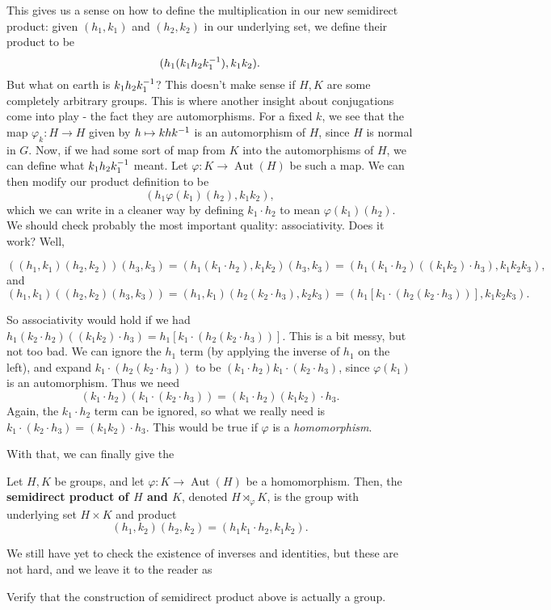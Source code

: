 \documentclass[./main.tex]{subfiles}
\begin{document}
This gives us a sense on how to define the multiplication in our new semidirect product:
given $(h_1,k_1)$ and $(h_2, k_2)$ in our underlying set, we define their product to be 
\[
    (h_1 (k_1 h_2 k_1^{-1}), k_1 k_2). 
\]
But what on earth is $k_1 h_2 k_1^{-1}$? This doesn't make sense if $H, K$ are
some completely arbitrary groups. This is where another insight about
conjugations come into play - the fact they are automorphisms. For a fixed $k$,
we see that the map $\varphi_k: H \to H$ given by $h \mapsto k h k^{-1}$ is an
automorphism of $H$, since $H$ is normal in $G$. Now, if we had some sort of map
from $K$ into the automorphisms of $H$, we can define what $k_1 h_2 k_1^{-1}$
meant. Let $\varphi: K \to \operatorname{Aut}(H)$ be such a map. We can then
modify our product definition to be 
\[
    (h_1 \varphi(k_1)(h_2), k_1 k_2),
\]
which we can write in a cleaner way by defining $k_1 \cdot h_2$ to mean
$\varphi(k_1)(h_2)$. We should check probably the most important quality:
associativity. Does it work? Well,

\[
    ((h_1, k_1)(h_2, k_2))(h_3, k_3) = (h_1 (k_1 \cdot h_2), k_1 k_2) (h_3, k_3) = (h_1 (k_1 \cdot h_2) ((k_1 k_2) \cdot h_3), k_1 k_2 k_3),
\]
and 
\[
    (h_1, k_1)((h_2, k_2)(h_3, k_3)) = (h_1, k_1) (h_2 (k_2 \cdot h_3), k_2 k_3) = (h_1 [k_1 \cdot (h_2 (k_2 \cdot h_3))], k_1 k_2 k_3).
\]

So associativity would hold if we had $h_1 (k_2 \cdot h_2)( (k_1 k_2) \cdot h_3)
= h_1 [k_1 \cdot (h_2 (k_2 \cdot h_3))]$. This is a bit messy, but not too bad.
We can ignore the $h_1$ term (by applying the inverse of $h_1$ on the left), and
expand $k_1 \cdot (h_2 (k_2 \cdot h_3))$ to be $(k_1 \cdot h_2) k_1 \cdot (k_2
\cdot h_3)$, since $\varphi(k_1)$ is an automorphism. Thus we need 
\[
    (k_1 \cdot h_2) (k_1 \cdot (k_2 \cdot h_3)) = (k_1 \cdot h_2) (k_1 k_2) \cdot h_3.
\]
Again, the $k_1 \cdot h_2$ term can be ignored, so what we really need is $k_1
\cdot (k_2 \cdot h_3) = (k_1 k_2) \cdot h_3$. This would be true if $\varphi$ is
a \emph{homomorphism}. 

With that, we can finally give the 

\begin{definition}
\label{def:semidirect-product}
    Let $H, K$ be groups, and let $\varphi: K \to \operatorname{Aut}(H)$ be a
    homomorphism. Then, the \textbf{semidirect product of $H$ and $K$}, denoted
    $H \rtimes_\varphi K$, is the group with underlying set $H \times K$ and product 
    \[
        (h_1, k_2) (h_2, k_2) = (h_1 k_1 \cdot h_2, k_1 k_2).
    \]
\end{definition}
We still have yet to check the existence of inverses and identities, but these
are not hard, and we leave it to the reader as 
\begin{exercise}
    Verify that the construction of semidirect product above is actually a
    group. 
\end{exercise}
\end{document}
